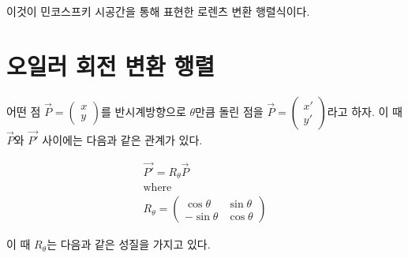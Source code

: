 \documentclass{thesis-SJ}
\begin{document}
이것이 민코스프키 시공간을 통해 표현한 로렌츠 변환 행렬식이다.

\section{오일러 회전 변환 행렬}

어떤 점 $\vec{P} = \begin{pmatrix}
x\\y
\end{pmatrix}$를 반시계방향으로 $\theta$만큼 돌린 점을 $\vec{P} = \begin{pmatrix}
x'\\y'
\end{pmatrix}$라고 하자. 이 때 $\vec{P}$와 $\vec{P'}$ 사이에는 다음과 같은 관계가 있다.

\begin{equation}
\begin{gathered}
\vec{P'}=R_\theta \vec{P} \\
\text{where} \\
R_\theta = \begin{pmatrix}
\cos \theta & \sin \theta \\
-\sin \theta & \cos \theta 
\end{pmatrix}
\end{gathered}
\end{equation}

이 때 $R_\theta$는 다음과 같은 성질을 가지고 있다.
\end{document}
